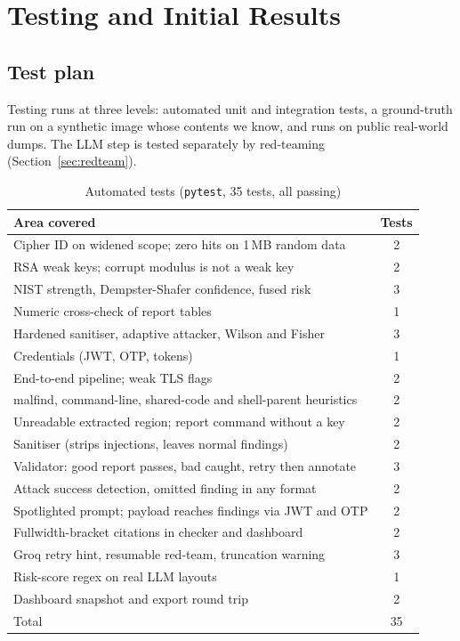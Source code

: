 \section{Testing and Initial Results}
\label{sec:testing}

\subsection{Test plan}
Testing runs at three levels: automated unit and integration tests, a ground-truth run on a synthetic image
whose contents we know, and runs on public real-world dumps. The LLM step is tested separately by
red-teaming (Section~\ref{sec:redteam}).

\begin{table}[t]
\centering
\caption{Automated tests (\texttt{pytest}, 35 tests, all passing)}
\label{tab:tests}
\footnotesize
\begin{tabularx}{\columnwidth}{@{}Xc@{}}
\toprule
Area covered & Tests\\
\midrule
Cipher ID on widened scope; zero hits on 1\,MB random data & 2\\
RSA weak keys; corrupt modulus is not a weak key & 2\\
NIST strength, Dempster-Shafer confidence, fused risk & 3\\
Numeric cross-check of report tables & 1\\
Hardened sanitiser, adaptive attacker, Wilson and Fisher & 3\\
Credentials (JWT, OTP, tokens) & 1\\
End-to-end pipeline; weak TLS flags & 2\\
malfind, command-line, shared-code and shell-parent heuristics & 2\\
Unreadable extracted region; report command without a key & 2\\
Sanitiser (strips injections, leaves normal findings) & 2\\
Validator: good report passes, bad caught, retry then annotate & 3\\
Attack success detection, omitted finding in any format & 2\\
Spotlighted prompt; payload reaches findings via JWT and OTP & 2\\
Fullwidth-bracket citations in checker and dashboard & 2\\
Groq retry hint, resumable red-team, truncation warning & 3\\
Risk-score regex on real LLM layouts & 1\\
Dashboard snapshot and export round trip & 2\\
\midrule
Total & 35\\
\bottomrule
\end{tabularx}
\end{table}

